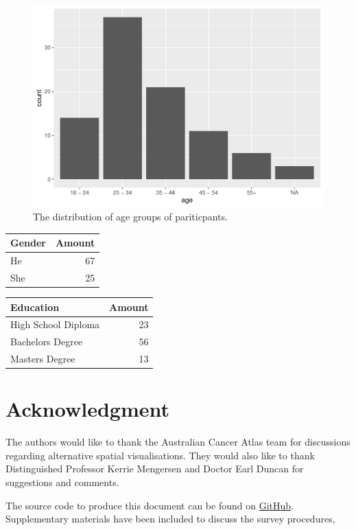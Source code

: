 \documentclass[conference,final,]{IEEEtran}
\makeatletter
\def\maxwidth{\ifdim\Gin@nat@width>\linewidth\linewidth
\else\Gin@nat@width\fi}
\let\Oldincludegraphics\includegraphics
\renewcommand{\includegraphics}[1]{\Oldincludegraphics[width=\maxwidth]{#1}}
\makeatother
\begin{document}
\begin{figure}
\centering
\includegraphics{paper_files/figure-latex/demogs-1.pdf}
\caption{\label{fig:demogs}The distribution of age groups of pariticpants.}
\end{figure}

\begin{tabular}{lr}
\toprule
Gender & Amount\\
\midrule
He & 67\\
She & 25\\
\bottomrule
\end{tabular}

\begin{tabular}{lr}
\toprule
Education & Amount\\
\midrule
High School Diploma & 23\\
Bachelors Degree & 56\\
Masters Degree & 13\\
\bottomrule
\end{tabular}

\hypertarget{acknowledgment-1}{%
\section{Acknowledgment}\label{acknowledgment-1}}

The authors would like to thank the Australian Cancer Atlas team for discussions regarding alternative spatial visualisations. They would also like to thank Distinguished Professor Kerrie Mengersen and Doctor Earl Duncan for suggestions and comments.

The source code to produce this document can be found on \href{https://github.com/srkobakian/experiment/tree/master/paper}{GitHub}.
Supplementary materials have been included to discuss the survey procedures,
\end{document}
